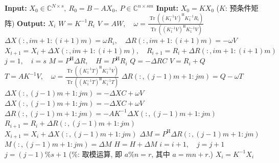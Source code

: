 \begin{algorithm}[H]\caption{{预条件块 IDR($s$) 方法}}\label{alg:preconditioned-block-idr}\begin{algorithmic}[1]
\Statex\textbf{Input:} $X_0\in\mathbb C^{N\times s},\ R_0=B-AX_0,\ P\in\mathbb C^{n\times sm}$
\Statex\textbf{Input:} $X_0=KX_0$ ($K$: {预条件矩阵})
\Statex\textbf{Output:} $X_i$
\State $W=K^{-1}R_i$
\State $V=AW,\quad\omega=\frac{\operatorname{Tr}((K_1^{-1}V)^{\mathrm H}K_1^{-1}R_i)}{\operatorname{Tr}((K_1^{-1}V)^{\mathrm H}K_1^{-1}V)}$
\State $\Delta X(:,im+1:(i+1)m)=\omega R_i,\quad\Delta R(:,im+1:(i+1)m)=-\omega V$
\State $X_{i+1}=X_i+\Delta X(:,im+1:(i+1)m),\quad R_{i+1}=R_i+\Delta R(:,im+1:(i+1)m)$
\EndFor
\State $j=1,\quad i=s$
\State $M=P^{\mathrm H}\Delta R,\quad H=P^{\mathrm H}R_i$
\State $Q=-\Delta RC$
\State $V=R_i+Q$
\State $T=AK^{-1}V,\quad\omega=\frac{\operatorname{Tr}((K_1^{-1}T)^{\mathrm H}K_1^{-1}V)}{\operatorname{Tr}((K_1^{-1}T)^{\mathrm H}K_1^{-1}T)}$
\State $\Delta R(:,(j-1)m+1:jm)=Q-\omega T$
\State $\Delta X(:,(j-1)m+1:jm)=-\Delta XC+\omega V$
\Else
\State $\Delta X(:,(j-1)m+1:jm)=-\Delta XC+\omega V$
\State $\Delta R(:,(j-1)m+1:jm)=-AK^{-1}\Delta X(:,(j-1)m+1:jm)$
\EndIf
\State $R_{i+1}=R_i+\Delta R(:,(j-1)m+1:jm)$
\State $X_{i+1}=X_i+\Delta X(:,(j-1)m+1:jm)$
\State $\Delta M=P^{\mathrm H}\Delta R(:,(j-1)m+1:jm)$
\State $M(:,(j-1)m+1:jm)=\Delta M$
\State $H=H+\Delta M$
\State $i=i+1,\quad j=j+1$
\State $j=(j-1)\%s+1$ ({$\%$: 取模运算, 即 $a\%n=r$, 其中 $a=mn+r$.})
\EndFor\EndWhile
\State $X_i=K^{-1}X_i$
\end{algorithmic}\end{algorithm}
